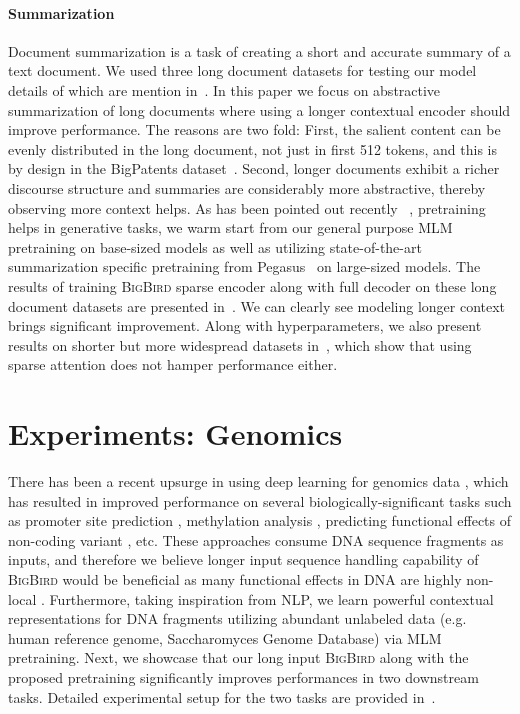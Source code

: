 \documentclass{article}
\newcommand{\bigb}{\textsc{BigBird}\xspace}
\begin{document}
\paragraph{Summarization}
Document summarization is a task of creating a short and accurate summary of a text document. 
We used three long document datasets for testing our model details of which are mention in~.
In this paper we focus on abstractive summarization of long documents where using a longer contextual encoder should improve performance.
The reasons are two fold:
First, the salient content can be evenly distributed in the long document, not just in first 512 tokens, and this is by design in the BigPatents dataset~\citep{sharma2019bigpatent}.
Second, longer documents exhibit a richer discourse structure and summaries are considerably more abstractive, thereby observing more context helps.
As has been pointed out recently ~\citep{rothe2019leveraging,zhang2019pegasus}, pretraining helps in generative tasks, we warm start from our general purpose MLM pretraining on base-sized models as well as utilizing state-of-the-art summarization specific pretraining from Pegasus~\citep{zhang2019pegasus} on large-sized models.
The results of training \bigb sparse encoder along with full decoder on these long document datasets are presented in~.
We can clearly see modeling longer context brings significant improvement. 
Along with hyperparameters, we also present results on shorter but more widespread datasets in~, which show that using sparse attention does not hamper performance either.

 
\section{Experiments: Genomics} 
\label{sec:expt-bio}

There has been a recent upsurge in using deep learning for genomics data \citep{tampuu2019viraminer, zhang2019ncnet, busia2019deep}, which has resulted in improved performance on several biologically-significant tasks such as
promoter site prediction \citep{oubounyt2019deepromoter}, methylation analysis \citep{levy2020methylnet}, 
predicting functional effects of non-coding variant \citep{zhou2015predicting}, etc.
These approaches consume DNA sequence fragments as inputs, and therefore we believe longer input sequence handling capability of \bigb would be beneficial as many functional effects in DNA are highly non-local \citep{buldyrev1995long}.
Furthermore, taking inspiration from NLP, we learn powerful contextual representations for DNA fragments utilizing abundant unlabeled data (e.g. human reference genome, Saccharomyces Genome Database) via MLM pretraining.
Next, we showcase that our long input \bigb along with the proposed pretraining significantly improves performances in two downstream tasks.
Detailed experimental setup for the two tasks are provided in~.
\end{document}
